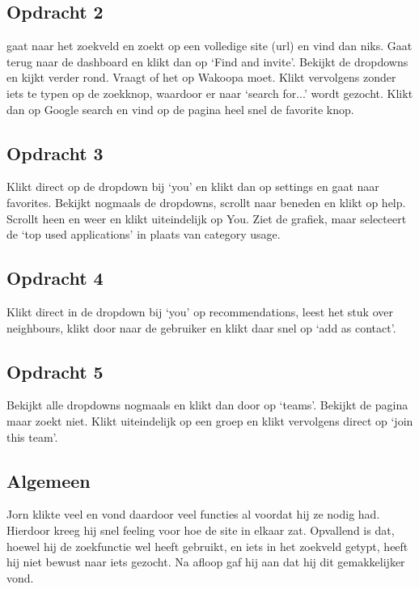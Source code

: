 \subsection{Opdracht 2}
gaat naar het zoekveld en zoekt op een volledige site (url) en vind dan niks. Gaat terug naar de dashboard en klikt dan op `Find and invite'. Bekijkt de dropdowns en kijkt verder rond. Vraagt of het op Wakoopa moet. Klikt vervolgens zonder iets te typen op de zoekknop, waardoor er naar `search for...' wordt gezocht. Klikt dan op Google search en vind op de pagina heel snel de favorite knop.

\subsection{Opdracht 3}
Klikt direct op de dropdown bij `you' en klikt dan op settings en gaat naar favorites. Bekijkt nogmaals de dropdowns, scrollt naar beneden en klikt op help. Scrollt heen en weer en klikt uiteindelijk op You. Ziet de grafiek, maar selecteert de `top used applications' in plaats van category usage.

\subsection{Opdracht 4}
Klikt direct in de dropdown bij `you' op recommendations, leest het stuk over neighbours, klikt door naar de gebruiker en klikt daar snel op `add as contact'.

\subsection{Opdracht 5}
Bekijkt alle dropdowns nogmaals en klikt dan door op `teams'. Bekijkt de pagina maar zoekt niet. Klikt uiteindelijk op een groep en klikt vervolgens direct op `join this team'.

\subsection{Algemeen}
Jorn klikte veel en vond daardoor veel functies al voordat hij ze nodig had. Hierdoor kreeg hij snel feeling voor hoe de site in elkaar zat. Opvallend is dat, hoewel hij de zoekfunctie wel heeft gebruikt, en iets in het zoekveld getypt, heeft hij niet bewust naar iets gezocht. Na afloop gaf hij aan dat hij dit gemakkelijker vond.

